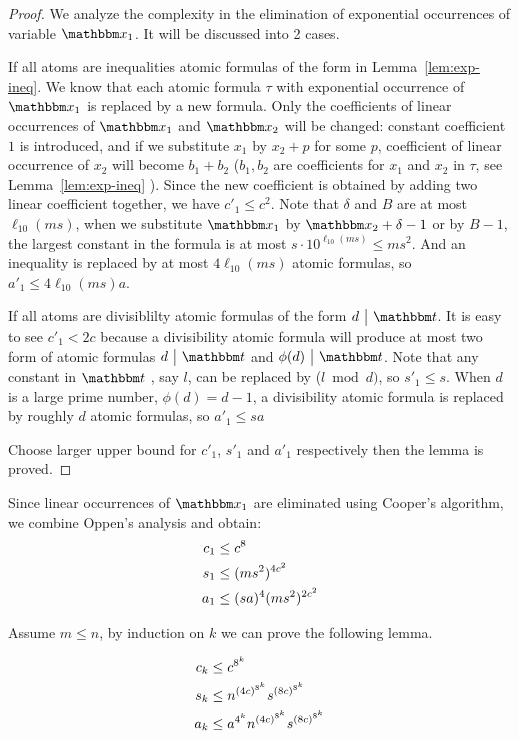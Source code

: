 \begin{proof}
We analyze the complexity in the elimination of exponential occurrences of variable $\ivarx_1$. It will be discussed into 2 cases.

If all atoms are inequalities atomic formulas of the form in Lemma~\ref{lem:exp-ineq}. We know that each atomic formula $\tau$ with exponential occurrence of $\ivarx_1$ is replaced by a new formula. Only the coefficients of linear occurrences of $\ivarx_1$ and $\ivarx_2$ will be changed: constant coefficient $1$ is introduced, and if we substitute $x_1$ by $x_2+p$ for some $p$, coefficient of linear occurrence of $x_2$ will become $b_1+b_2$ ($b_1,b_2$ are coefficients for $x_1$ and $x_2$ in $\tau$, see Lemma~\ref{lem:exp-ineq} ). Since the new coefficient is obtained by adding two linear coefficient together, we have $c'_1\le c^2$. Note that $\delta$ and $B$ are at most $\ell_{10}(ms)$, when we substitute $\ivarx_1$ by $\ivarx_2+\delta-1$ or by $B-1$, the largest constant in the formula is at most $s\cdot  10^{\ell_{10}(ms)}\le ms^2$. And an inequality is replaced by at most $4\ell_{10}(ms)$ atomic formulas, so $a'_1\le 4\ell_{10}(ms)a$.

If all atoms are divisiblilty atomic formulas of the form $d \ \big | \ \iterm$. It is easy to see $c'_1<2c$ because a divisibility atomic formula  will produce at most two form of atomic formulas $d \ \big | \ \iterm$ and $\phi(d) \ \big | \ \iterm$. Note that any constant in $\iterm$ , say $l$, can be replaced by ($l \bmod d)$, so $s'_1\le s$. When $d$ is a large prime number, $\phi(d)=d-1$, a divisibility atomic formula is replaced by roughly $d$ atomic formulas, so $a'_1\le sa$ 

Choose larger upper bound for $c'_1$, $s'_1$ and $a'_1$ respectively then the lemma is proved.

\end{proof}

Since linear occurrences of $\ivarx_1$ are eliminated using Cooper's algorithm, we combine Oppen's analysis and obtain:
\begin{align}
    c_1&\le c^8 \notag \\
    s_1&\le (ms^2)^{4c^2} \notag\\
    a_1&\le (sa)^4(ms^2)^{2c^2}\notag 
\end{align} 

Assume $m\le n$, by induction on $k$ we can prove the following lemma.

\begin{lemma}
    \begin{align}
        c_k&\le c^{8^k} \notag \\
        s_k&\le n^{(4c)^{ 8^k}} s^{(8c)^{ 8^k}} \notag\\
        a_k&\le a^{4^k}n^{(4c)^{ 8^k}} s^{(8c)^{ 8^k}} \notag
    \end{align} 
\end{lemma}

